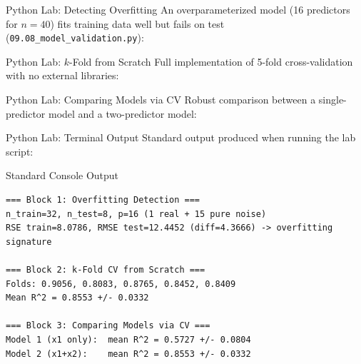 \documentclass[10pt, aspectratio=169]{beamer}
\begin{document}
\begin{frame}[fragile]{Python Lab: Detecting Overfitting}
  \scriptsize
  An overparameterized model (16 predictors for $n=40$) fits training data well but fails on test (\texttt{09.08\_model\_validation.py}):
  {
  }
\end{frame}

\begin{frame}[fragile]{Python Lab: $k$-Fold from Scratch}
  \scriptsize
  Full implementation of 5-fold cross-validation with no external libraries:
  {
  }
\end{frame}

\begin{frame}[fragile]{Python Lab: Comparing Models via CV}
  \scriptsize
  Robust comparison between a single-predictor model and a two-predictor model:
  {
  }
\end{frame}

\begin{frame}[fragile]{Python Lab: Terminal Output}
  \scriptsize
  Standard output produced when running the lab script:
  \vspace{0.02cm}
  \begin{block}{Standard Console Output}
    \fontsize{3.4pt}{4.1pt}\selectfont
    \begin{verbatim}
=== Block 1: Overfitting Detection ===
n_train=32, n_test=8, p=16 (1 real + 15 pure noise)
RSE train=8.0786, RMSE test=12.4452 (diff=4.3666) -> overfitting signature

=== Block 2: k-Fold CV from Scratch ===
Folds: 0.9056, 0.8083, 0.8765, 0.8452, 0.8409
Mean R^2 = 0.8553 +/- 0.0332

=== Block 3: Comparing Models via CV ===
Model 1 (x1 only):  mean R^2 = 0.5727 +/- 0.0804
Model 2 (x1+x2):    mean R^2 = 0.8553 +/- 0.0332
    \end{verbatim}
  \end{block}
\end{frame}
\end{document}
